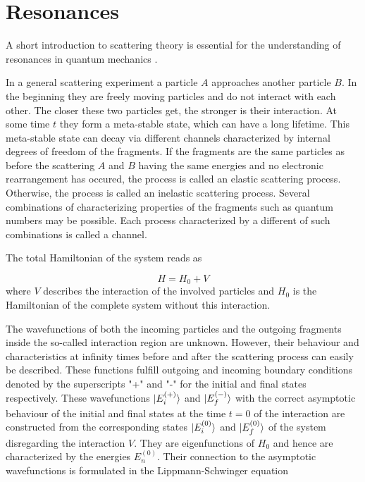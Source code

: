\chapter{Resonances}

A short introduction to scattering theory is essential for the understanding
of resonances in quantum mechanics \cite{nolting52,Gell-Mann53,Taylor87}.

In a general scattering experiment a particle $A$ approaches another
particle $B$. In the beginning they are freely moving particles and do not interact
with each other. The closer these two particles get, the stronger is their interaction.
At some time $t$ they form a meta-stable state, which can have a long lifetime.
This meta-stable state can decay via different channels characterized
by internal degrees of freedom of the fragments. If the fragments are the
same particles as before the scattering $A$ and $B$ having the same
energies and no electronic rearrangement
has occured, the process is called an elastic scattering process.
Otherwise, the process is called an inelastic scattering process.
Several combinations of characterizing properties of the fragments such as
quantum numbers may be possible. Each process characterized by a different
of such combinations is called a channel.

The total Hamiltonian of the system reads as

\begin{equation}
 H = H_0 + V
\end{equation}
where $V$ describes the interaction of the involved particles and
$H_0$ is the Hamiltonian of the complete system without this interaction.

The wavefunctions of both the incoming particles and the outgoing
fragments inside the so-called interaction region are unknown.
However, their behaviour and characteristics at infinity times before
and after the scattering process can easily be described.
These functions fulfill outgoing and incoming boundary conditions
denoted by the superscripts "+" and "-" for the initial and final states
respectively.
These wavefunctions $\ket{E_i^{(+)}}$ and $\ket{E_f^{(-)}}$ with the correct
asymptotic behaviour
of the initial and final states at the time $t=0$ of the interaction
are constructed from the corresponding states $\ket{E_i^{(0)}}$ and
$\ket{E_f^{(0)}}$ of the system disregarding the interaction $V$.
They are eigenfunctions of $H_0$ and hence
are characterized by the energies $E_n^{(0)}$.
Their connection to the asymptotic wavefunctions is
formulated in the Lippmann-Schwinger equation

